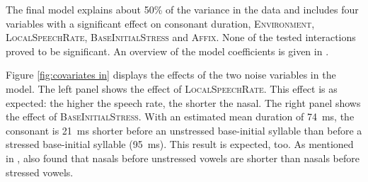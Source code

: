 The final model explains about 50\% of the variance in the data and includes four variables with a significant effect on consonant duration, \textsc{Environment}, \textsc{LocalSpeechRate}, \textsc{BaseInitialStress} and \textsc{Affix}. None of the tested interactions proved to be significant. 
An overview of the model coefficients is given in .%

\clearpage

\begin{table}[h!]

	\caption{ Summary of linear model for variables predicting the Box-Cox-transformed duration of [m] in prefixed words}
	\label{tbl: summary model2}
	\begin{center}
	\end{center}
\vspace*{-0.4cm}
\end{table}


Figure \ref{fig:covariates in} displays the effects of the two noise variables in the model. The left panel shows the effect of  \textsc{LocalSpeechRate}. This effect is as expected: 
the higher the speech rate, the shorter the nasal. The right panel shows the effect of \textsc{BaseInitialStress}. With an estimated mean duration of 74~ms, the consonant is 21~ms shorter before an unstressed base-initial syllable than before a stressed base-initial syllable (95~ms). This result is expected, too. As mentioned in , \cite{Umeda.1977} also found that nasals before unstressed vowels are shorter than nasals before stressed vowels.

